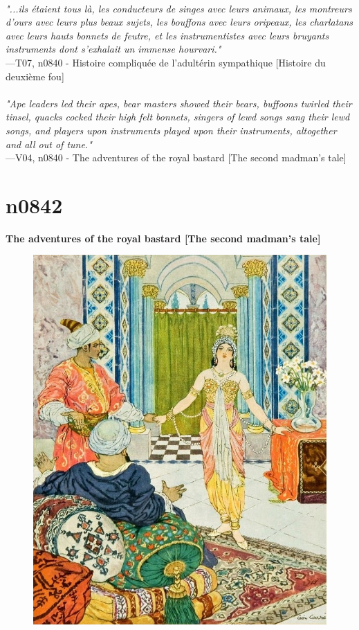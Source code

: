 \documentclass[../Carre_nights.tex]{subfiles}
\begin{document}
\textit{\\
"...ils étaient tous là, les conducteurs de singes avec leurs animaux, les montreurs d’ours avec leurs plus beaux sujets, les bouffons avec leurs oripeaux, les charlatans avec leurs hauts bonnets de feutre, et les instrumentistes avec leurs bruyants instruments dont s’exhalait un immense hourvari."} \\
—T07, n0840 - Histoire compliquée de l’adultérin sympathique [Histoire du deuxième fou] \\~\\
\textit{"Ape leaders led their apes, bear masters showed their bears, buffoons twirled their tinsel, quacks cocked their high felt bonnets, singers of lewd songs sang their lewd songs, and players upon instruments played upon their instruments, altogether and all out of tune."} \\
—V04, n0840 - The adventures of the royal bastard [The second madman’s tale]

\newpage

\section{n0842}
\textbf{\Large{The adventures of the royal bastard [The second madman’s tale]}} \\

\begin{figure}[ht]
\centering
\includegraphics[height=\figsize]{illustrations/volume_7/T07, n0842 - Histoire compliquée de l’adultérin sympathique [Histoire du deuxième fou].jpg}
\end{figure}
\end{document}
